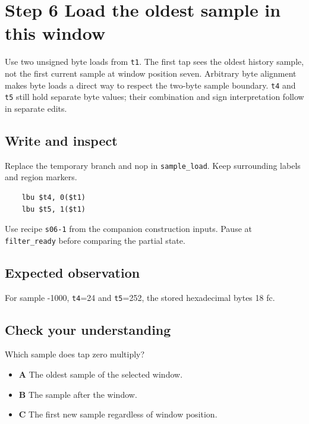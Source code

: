 \section{Step 6 Load the oldest sample in this window}\label{fir-s06}

Use two unsigned byte loads from \texttt{t1}. The first tap sees the oldest history sample, not the first current sample at window position seven. Arbitrary byte alignment makes byte loads a direct way to respect the two-byte sample boundary. \texttt{t4} and \texttt{t5} still hold separate byte values; their combination and sign interpretation follow in separate edits.

\subsection{Write and inspect}
Replace the temporary branch and nop in \texttt{sample\_load}. Keep surrounding labels and region markers.

\begin{verbatim}
    lbu $t4, 0($t1)
    lbu $t5, 1($t1)
\end{verbatim}
Use recipe \texttt{s06-1} from the companion construction inputs. Pause at \texttt{filter\_ready} before comparing the partial state.

\subsection{Expected observation}
For sample -1000, \texttt{t4}=24 and \texttt{t5}=252, the stored hexadecimal bytes 18 fc.

\subsection{Check your understanding}
Which sample does tap zero multiply?

\begin{itemize}
  \item \textbf{A} The oldest sample of the selected window.
  \item \textbf{B} The sample after the window.
  \item \textbf{C} The first new sample regardless of window position.
\end{itemize}
